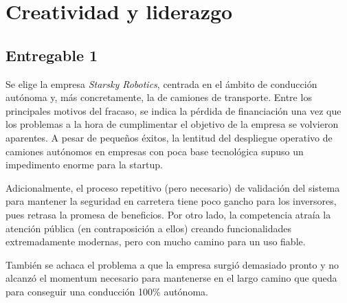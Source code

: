 \section{Creatividad y liderazgo}


\subsection{Entregable 1}

Se elige la empresa \textit{Starsky Robotics}, centrada en el ámbito de conducción autónoma y, más concretamente, la de camiones de transporte. Entre los principales motivos del fracaso, se indica la pérdida de financiación una vez que los problemas a la hora de cumplimentar el objetivo de la empresa se volvieron aparentes. A pesar de pequeños éxitos, la lentitud del despliegue operativo de camiones autónomos en empresas con poca base tecnológica supuso un impedimento enorme para la startup.

\vspace{\baselineskip}

Adicionalmente, el proceso repetitivo (pero necesario) de validación del sistema para mantener la seguridad en carretera tiene poco gancho para los inversores, pues retrasa la promesa de beneficios. Por otro lado, la competencia atraía la atención pública (en contraposición a ellos) creando funcionalidades extremadamente modernas, pero con mucho camino para un uso fiable.

\vspace{\baselineskip}

También se achaca el problema a que la empresa surgió demasiado pronto y no alcanzó el momentum necesario para mantenerse en el largo camino que queda para conseguir una conducción 100\% autónoma.


